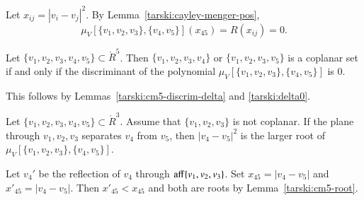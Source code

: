 \begin{tarskidata}
\begin{tarski}
\begin{proved}
Let $x_{ij}=|v_i-v_j|^2$.  By Lemma~\ref{tarski:cayley-menger-pos},
$$
\mu_V[\{v_1,v_2,v_3\},\{v_4,v_5\}](x_{45}) =R(x_{ij})=0.
$$
\swallowed\end{proved}
\end{tarski}




\begin{tarski}

\begin{lemma}
Let $\{v_1,v_2,v_3,v_4,v_5\}\subset\ring{R}^5$.
Then $\{v_1,v_2,v_3,v_4\}$ or $\{v_1,v_2,v_3,v_5\}$ is a coplanar set
if and only if
the discriminant of the polynomial $\mu_V[\{v_1,v_2,v_3\},\{v_4,v_5\}]$ is $0$.
\end{lemma}

\begin{proved} This follows by Lemmas~\ref{tarski:cm5-discrim-delta} and \ref{tarski:delta0}.
\swallowed\end{proved}
\end{tarski}



\begin{tarski}

\begin{lemma}
Let $\{v_1,v_2,v_3,v_4,v_5\}\subset\ring{R}^3$.  Assume that $\{v_1,v_2,v_3\}$ is not coplanar.
If the plane through $v_1,v_2,v_3$ separates
$v_4$ from $v_5$, then $|v_4-v_5|^2$ is the larger root of 
$\mu_V[\{v_1,v_2,v_3\},\{v_4,v_5\}]$.
\end{lemma}

\begin{proved}  Let $v_4'$ be the reflection of $v_4$ through ${\operatorname{aff}}\{v_1,v_2,v_3\}$.
Set $x_{45}=|v_4-v_5|$ and $x'_{45}=|v_4-v_5|$.
Then $x'_{45} < x_{45}$ and both are roots by Lemma~\ref{tarski:cm5-root}.
\swallowed\end{proved}
\end{tarski}




\end{tarskidata}
